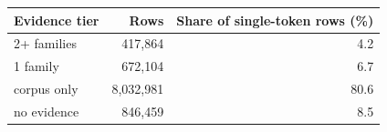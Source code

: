 \begin{tabular}{lrr}
\toprule
Evidence tier & Rows & Share of single-token rows (\%) \\
\midrule
2+ families & 417,864 & 4.2 \\
1 family & 672,104 & 6.7 \\
corpus only & 8,032,981 & 80.6 \\
no evidence & 846,459 & 8.5 \\
\bottomrule
\end{tabular}
